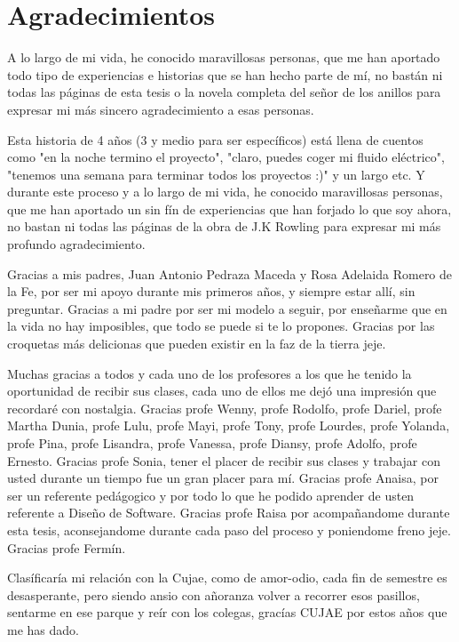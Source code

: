 \chapter*{Agradecimientos}

A lo largo de mi vida, he conocido maravillosas personas, que me han aportado todo tipo de experiencias e historias que se han hecho parte de mí, no bastán ni todas las páginas de esta tesis o la novela completa del señor de los anillos para expresar mi más sincero agradecimiento a esas personas.

Esta historia de 4 años (3 y medio para ser específicos) está llena de cuentos como "en la noche termino el proyecto", "claro, puedes coger mi fluido eléctrico", "tenemos una semana para terminar todos los proyectos :)" y un largo etc. Y durante este proceso y a lo largo de mi vida, he conocido maravillosas personas, que me han aportado un sin fín de experiencias que han forjado lo que soy ahora, no bastan ni todas las páginas de la obra de J.K Rowling para expresar mi más profundo agradecimiento.

Gracias a mis padres, Juan Antonio Pedraza Maceda y Rosa Adelaida Romero de la Fe, por ser mi apoyo durante mis primeros años, y siempre estar allí, sin preguntar. Gracias a mi padre por ser mi modelo a seguir, por enseñarme que en la vida no hay imposibles, que todo se puede si te lo propones. Gracias por las croquetas más delicionas que pueden existir en la faz de la tierra jeje.


Muchas gracias a todos y cada uno de los profesores a los que he tenido la oportunidad de recibir sus clases, cada uno de ellos me dejó una impresión que recordaré con nostalgia. Gracias profe Wenny, profe Rodolfo, profe Dariel, profe Martha Dunia, profe Lulu, profe Mayi, profe Tony, profe Lourdes, profe Yolanda, profe Pina, profe Lisandra, profe Vanessa, profe Diansy, profe Adolfo, profe Ernesto. Gracias profe Sonia, tener el placer de recibir sus clases y trabajar con usted durante un tiempo fue un gran placer para mí. Gracias profe Anaisa, por ser un referente pedágogico y por todo lo que he podido aprender de usten referente a Diseño de Software. Gracias profe Raisa por acompañandome durante esta tesis, aconsejandome durante cada paso del proceso y poniendome freno jeje. Gracias profe Fermín.

Clasíficaría mi relación con la Cujae, como de amor-odio, cada fin de semestre es desasperante, pero siendo ansio con añoranza volver a recorrer esos pasillos, sentarme en ese parque y reír con los colegas, gracías CUJAE por estos años que me has dado.